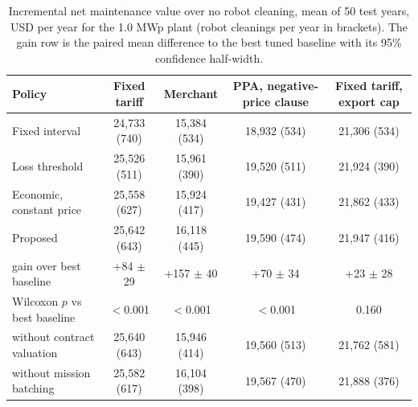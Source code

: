 \begin{table}[!t]
\centering
\caption{Incremental net maintenance value over no robot cleaning, mean of 50 test years, USD per year for the 1.0 MWp plant (robot cleanings per year in brackets). The gain row is the paired mean difference to the best tuned baseline with its 95\% confidence half-width.}
\label{tab:rq1}
\begin{tabular}{lcccc}
\toprule
Policy & Fixed tariff & Merchant & PPA, negative-price clause & Fixed tariff, export cap \\
\midrule
Fixed interval & 24,733 (740) & 15,384 (534) & 18,932 (534) & 21,306 (534) \\
Loss threshold & 25,526 (511) & 15,961 (390) & 19,520 (511) & 21,924 (390) \\
Economic, constant price & 25,558 (627) & 15,924 (417) & 19,427 (431) & 21,862 (433) \\
Proposed & 25,642 (643) & 16,118 (445) & 19,590 (474) & 21,947 (416) \\
\quad gain over best baseline & +84 $\pm$ 29 & +157 $\pm$ 40 & +70 $\pm$ 34 & +23 $\pm$ 28 \\
\quad Wilcoxon $p$ vs best baseline & $<$0.001 & $<$0.001 & $<$0.001 & 0.160 \\
\quad without contract valuation & 25,640 (643) & 15,946 (414) & 19,560 (513) & 21,762 (581) \\
\quad without mission batching & 25,582 (617) & 16,104 (398) & 19,567 (470) & 21,888 (376) \\
\bottomrule
\end{tabular}
\end{table}
